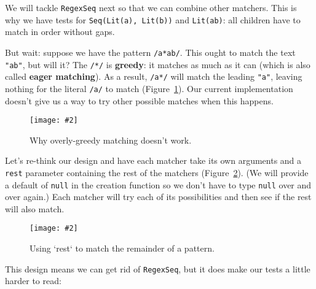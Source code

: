 \documentclass[krantzl]{krantz}
\newcommand{\figpdf}[4]{\begin{figure}%
\centering%
\texttt{[image: \#2]}%
\caption{#3}%
\label{#1}%
\end{figure}}
\newcommand{\figref}[1]{Figure~\ref{#1}}
\newcommand{\glossref}[1]{\textbf{#1}}
\begin{document}
We will tackle \texttt{RegexSeq} next so that we can combine other matchers.
This is why we have tests for \texttt{Seq(Lit({\textquotesingle}a{\textquotesingle}), Lit({\textquotesingle}b{\textquotesingle}))} and \texttt{Lit({\textquotesingle}ab{\textquotesingle})}:
all children have to match in order without gaps.


But wait:
suppose we have the pattern \texttt{/a*ab/}.
This ought to match the text \texttt{"ab"}, but will it?
The \texttt{/*/} is \glossref{greedy}: it matches as much as it can
(which is also called \glossref{eager matching}).
As a result,
\texttt{/a*/} will match the leading \texttt{"a"}, leaving nothing for the literal \texttt{/a/} to match
(\figref{pattern-matching-greedy-failure}).
Our current implementation doesn't give us a way to try other possible matches when this happens.

\figpdf{pattern-matching-greedy-failure}{./pattern-matching/greedy-failure.pdf}{Why overly-greedy matching doesn't work.}{0.6}


Let's re-think our design
and have each matcher take its own arguments and a \texttt{rest} parameter containing the rest of the matchers
(\figref{pattern-matching-rest}).
(We will provide a default of \texttt{null} in the creation function
so we don't have to type \texttt{null} over and over again.)
Each matcher will try each of its possibilities and then see if the rest will also match.

\figpdf{pattern-matching-rest}{./pattern-matching/rest.pdf}{Using `rest` to match the remainder of a pattern.}{0.6}


This design means we can get rid of \texttt{RegexSeq},
but it does make our tests a little harder to read:
\end{document}
